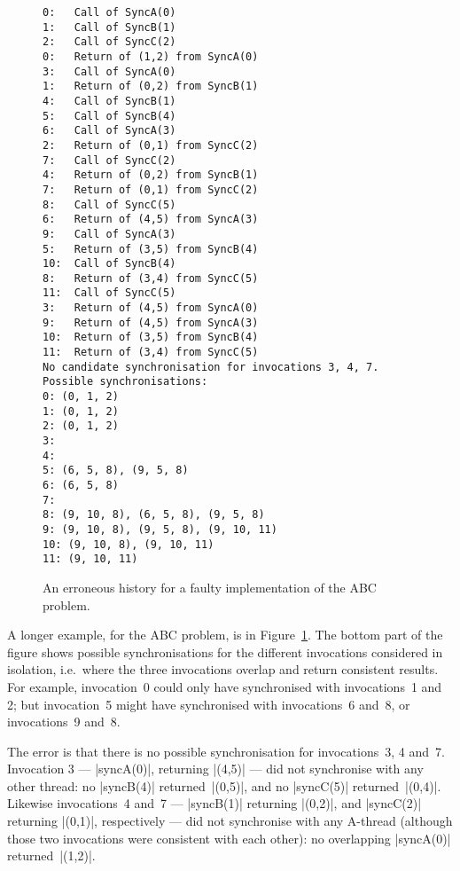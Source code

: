 \begin{figure}
\errorsize
\begin{verbatim}
0:   Call of SyncA(0)
1:   Call of SyncB(1)
2:   Call of SyncC(2)
0:   Return of (1,2) from SyncA(0)
3:   Call of SyncA(0)
1:   Return of (0,2) from SyncB(1)
4:   Call of SyncB(1)
5:   Call of SyncB(4)
6:   Call of SyncA(3)
2:   Return of (0,1) from SyncC(2)
7:   Call of SyncC(2)
4:   Return of (0,2) from SyncB(1)
7:   Return of (0,1) from SyncC(2)
8:   Call of SyncC(5)
6:   Return of (4,5) from SyncA(3)
9:   Call of SyncA(3)
5:   Return of (3,5) from SyncB(4)
10:  Call of SyncB(4)
8:   Return of (3,4) from SyncC(5)
11:  Call of SyncC(5)
3:   Return of (4,5) from SyncA(0)
9:   Return of (4,5) from SyncA(3)
10:  Return of (3,5) from SyncB(4)
11:  Return of (3,4) from SyncC(5)
No candidate synchronisation for invocations 3, 4, 7.
Possible synchronisations:
0: (0, 1, 2)
1: (0, 1, 2)
2: (0, 1, 2)
3: 
4: 
5: (6, 5, 8), (9, 5, 8)
6: (6, 5, 8)
7: 
8: (9, 10, 8), (6, 5, 8), (9, 5, 8)
9: (9, 10, 8), (9, 5, 8), (9, 10, 11)
10: (9, 10, 8), (9, 10, 11)
11: (9, 10, 11)
\end{verbatim}
\caption{An erroneous history for a faulty implementation of the ABC
  problem.  \label{fig:ABC-error}} 
\end{figure}


A longer example, for the ABC problem, is in Figure~\ref{fig:ABC-error}.  The
bottom part of the figure shows possible synchronisations for the different
invocations considered in isolation, i.e.~where the three invocations overlap
and return consistent results.  For example, invocation~0 could only have
synchronised with invocations~1 and 2; but invocation~5 might have
synchronised with invocations~6 and~8, or invocations~9 and~8.

The error is that there is no possible synchronisation for invocations~3, 4
and~7.  Invocation 3 --- |syncA(0)|, returning |(4,5)| --- did not synchronise
with any other thread: no |syncB(4)| returned~|(0,5)|, and no |syncC(5)|
returned~|(0,4)|.  Likewise invocations~4 and~7 --- |syncB(1)| returning
|(0,2)|, and |syncC(2)| returning |(0,1)|, respectively --- did not
synchronise with any A-thread (although those two invocations were consistent
with each other): no overlapping |syncA(0)| returned~|(1,2)|.


